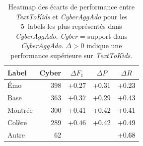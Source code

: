 \begin{table}[htbp]
  \centering
  \small
  \setlength{\tabcolsep}{4pt}
  \begin{tabular}{lrccc}
    \toprule
    \textbf{Label} & \textbf{Cyber} & \textbf{$\Delta F_1$} & \textbf{$\Delta P$} & \textbf{$\Delta R$} \\
    \midrule
    Émo & 398 & \cellcolor[HTML]{C7EA97}\textcolor{black}{+0.27} & \cellcolor[HTML]{D0EB8E}\textcolor{black}{+0.31} & \cellcolor[HTML]{C0EAA2}\textcolor{black}{+0.23} \\
    Base & 363 & \cellcolor[HTML]{E4EC7F}\textcolor{black}{+0.37} & \cellcolor[HTML]{CBEA92}\textcolor{black}{+0.29} & \cellcolor[HTML]{EEDC6F}\textcolor{black}{+0.43} \\
    Montrée & 300 & \cellcolor[HTML]{EEE172}\textcolor{black}{+0.41} & \cellcolor[HTML]{EEDF71}\textcolor{black}{+0.42} & \cellcolor[HTML]{EEE373}\textcolor{black}{+0.41} \\
    Colère & 289 & \cellcolor[HTML]{F0CB66}\textcolor{black}{+0.46} & \cellcolor[HTML]{EEDD6F}\textcolor{black}{+0.42} & \cellcolor[HTML]{F1BA5D}\textcolor{black}{+0.49} \\
    Autre & 62 & \cellcolor[HTML]{E4602C}\textcolor{white}{+0.76} & \cellcolor[HTML]{E25727}\textcolor{white}{+0.78} & \cellcolor[HTML]{E97B39}\textcolor{black}{+0.68} \\
    \bottomrule
  \end{tabular}
  \caption{Heatmap des écarts de performance entre \textit{TextToKids} et \textit{CyberAggAdo} pour les 5~labels les plus représentés dans \textit{CyberAggAdo}. \textit{Cyber} = support dans \textit{CyberAggAdo}. $\Delta > 0$ indique une performance supérieure sur \textit{TextToKids}.}
  \label{tab:heatmap-compact}
\end{table}

